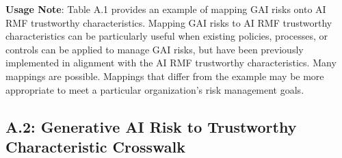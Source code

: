 \documentclass[fleqn]{article}
\begin{document}
\begin{landscape}
\noindent\textbf{Usage Note}: Table A.1 provides an example of mapping GAI risks onto AI RMF trustworthy characteristics. Mapping GAI risks to AI RMF trustworthy characteristics can be particularly useful when existing policies, processes, or controls can be applied to manage GAI risks, but have been previously implemented  in alignment with the AI RMF trustworthy characteristics. Many mappings are possible. Mappings that differ from the example may be more appropriate to meet a particular organization's risk management goals. 

\vfill
\raisebox{-10pt}{\makebox[\linewidth]{\thepage}}
\end{landscape}

\begin{landscape}
\thispagestyle{empty}	
\subsection*{A.2: Generative AI Risk to Trustworthy Characteristic Crosswalk}\label{sec:appndxa2}


\end{landscape}
\end{document}
